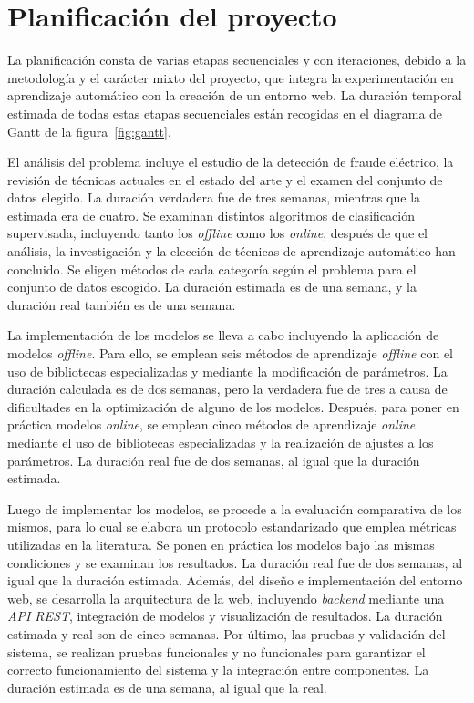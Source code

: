 \documentclass[12pt,a4paper]{report}
\begin{document}
\section{Planificación del proyecto}

La planificación consta de varias etapas secuenciales y con iteraciones, debido a la metodología y el carácter mixto del proyecto, que integra la experimentación en aprendizaje automático con la creación de un entorno web. La duración temporal estimada de todas estas etapas secuenciales están recogidas en el diagrama de Gantt de la figura~\ref{fig:gantt}. 

El análisis del problema incluye el estudio de la detección de fraude eléctrico, la revisión de técnicas actuales en el estado del arte y el examen del conjunto de datos elegido. La duración verdadera fue de tres semanas, mientras que la estimada era de cuatro. Se examinan distintos algoritmos de clasificación supervisada, incluyendo tanto los \emph{offline} como los \emph{online}, después de que el análisis, la investigación y la elección de técnicas de aprendizaje automático han concluido. Se eligen métodos de cada categoría según el problema para el conjunto de datos escogido. La duración estimada es de una semana, y la duración real también es de una semana.

La implementación de los modelos se lleva a cabo incluyendo la aplicación de modelos \emph{offline}. Para ello, se emplean seis métodos de aprendizaje \emph{offline} con el uso de bibliotecas especializadas y mediante la modificación de parámetros. La duración calculada es de dos semanas, pero la verdadera fue de tres a causa de dificultades en la optimización de alguno de los modelos. Después, para poner en práctica modelos \emph{online}, se emplean cinco métodos de aprendizaje \emph{online} mediante el uso de bibliotecas especializadas y la realización de ajustes a los parámetros. La duración real fue de dos semanas, al igual que la duración estimada. 

Luego de implementar los modelos, se procede a la evaluación comparativa de los mismos, para lo cual se elabora un protocolo estandarizado que emplea métricas utilizadas en la literatura. Se ponen en práctica los modelos bajo las mismas condiciones y se examinan los resultados. La duración real fue de dos semanas, al igual que la duración estimada. Además, del diseño e implementación del entorno web, se desarrolla la arquitectura de la web, incluyendo \emph{backend} mediante una \emph{API REST}, integración de modelos y visualización de resultados. La duración estimada y real son de cinco semanas. Por último,  las pruebas y validación del sistema, se realizan pruebas funcionales y no funcionales para garantizar el correcto funcionamiento del sistema y la integración entre componentes. La duración estimada es de una semana, al igual que la real.
\end{document}
